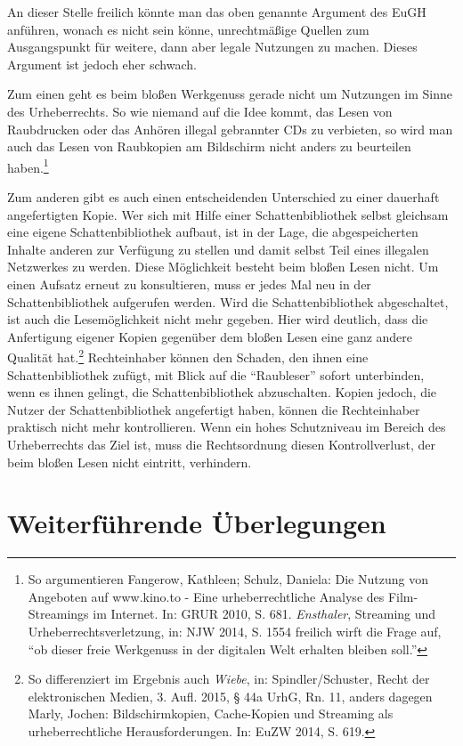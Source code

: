 \documentclass[a4paper,
fontsize=11pt,
oneside,
numbers=noperiodatend,
parskip=half-,
bibliography=totoc,
final
]{scrartcl}
\begin{document}
An dieser Stelle freilich könnte man das oben genannte Argument des EuGH
anführen, wonach es nicht sein könne, unrechtmäßige Quellen zum
Ausgangspunkt für weitere, dann aber legale Nutzungen zu machen. Dieses
Argument ist jedoch eher schwach.

Zum einen geht es beim bloßen Werkgenuss gerade nicht um Nutzungen im
Sinne des Urheberrechts. So wie niemand auf die Idee kommt, das Lesen
von Raubdrucken oder das Anhören illegal gebrannter CDs zu verbieten, so
wird man auch das Lesen von Raubkopien am Bildschirm nicht anders zu
beurteilen haben.\footnote{So argumentieren Fangerow, Kathleen; Schulz,
  Daniela: Die Nutzung von Angeboten auf www.kino.to - Eine
  urheberrechtliche Analyse des Film-Streamings im Internet. In: GRUR
  2010, S. 681. \emph{Ensthaler}, Streaming und Urheberrechtsverletzung,
  in: NJW 2014, S. 1554 freilich wirft die Frage auf, \enquote{ob dieser
  freie Werkgenuss in der digitalen Welt erhalten bleiben soll.}}

Zum anderen gibt es auch einen entscheidenden Unterschied zu einer
dauerhaft angefertigten Kopie. Wer sich mit Hilfe einer
Schattenbibliothek selbst gleichsam eine eigene Schattenbibliothek
aufbaut, ist in der Lage, die abgespeicherten Inhalte anderen zur
Verfügung zu stellen und damit selbst Teil eines illegalen Netzwerkes zu
werden. Diese Möglichkeit besteht beim bloßen Lesen nicht. Um einen
Aufsatz erneut zu konsultieren, muss er jedes Mal neu in der
Schattenbibliothek aufgerufen werden. Wird die Schattenbibliothek
abgeschaltet, ist auch die Lesemöglichkeit nicht mehr gegeben. Hier wird
deutlich, dass die Anfertigung eigener Kopien gegenüber dem bloßen Lesen
eine ganz andere Qualität hat.\footnote{So differenziert im Ergebnis
  auch \emph{Wiebe}, in: Spindler/Schuster, Recht der elektronischen
  Medien, 3. Aufl. 2015, § 44a UrhG, Rn. 11, anders dagegen Marly,
  Jochen: Bildschirmkopien, Cache-Kopien und Streaming als
  urheberrechtliche Herausforderungen. In: EuZW 2014, S. 619.}
Rechteinhaber können den Schaden, den ihnen eine Schattenbibliothek
zufügt, mit Blick auf die \enquote{Raubleser} sofort unterbinden, wenn
es ihnen gelingt, die Schattenbibliothek abzuschalten. Kopien jedoch,
die Nutzer der Schattenbibliothek angefertigt haben, können die
Rechteinhaber praktisch nicht mehr kontrollieren. Wenn ein hohes
Schutzniveau im Bereich des Urheberrechts das Ziel ist, muss die
Rechtsordnung diesen Kontrollverlust, der beim bloßen Lesen nicht
eintritt, verhindern.

\section*{Weiterführende
Überlegungen}\label{weiterfuxfchrende-uxfcberlegungen}
\end{document}
